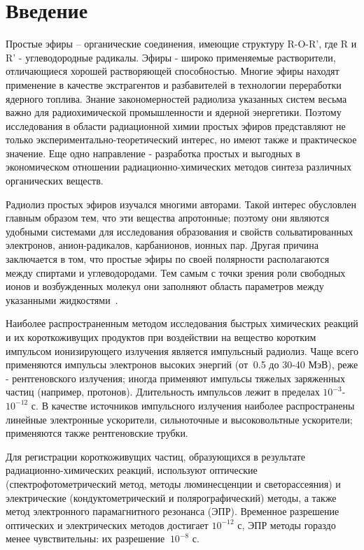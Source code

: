 \documentclass[14pt,titlepage]{extarticle}
\let\oldsection\section
\renewcommand{\section}{\newpage\oldsection}
\newcommand{\sectionwithoutnumber}[1]{
  \section*{#1}
  \addcontentsline{toc}{section}{#1}
}
\begin{document}
\sectionwithoutnumber{Введение}

Простые эфиры – органические соединения, имеющие структуру R-O-R’, где R и R' - углеводородные радикалы.  Эфиры - широко применяемые растворители, отличающиеся хорошей растворяющей способностью. Многие эфиры находят применение в качестве экстрагентов и разбавителей в технологии переработки ядерного топлива. Знание закономерностей радиолиза указанных систем весьма важно для радиохимической промышленности и ядерной энергетики. Поэтому исследования в области радиационной химии простых эфиров представляют не только экспериментально-теоретический интерес, но имеют также и практическое значение. Еще одно направление - разработка простых и выгодных в экономическом отношении радиационно-химических методов синтеза различных органических веществ.

Радиолиз простых эфиров изучался многими авторами. Такой интерес обусловлен главным образом тем, что эти вещества апротонные; поэтому они являются удобными системами для исследования образования и свойств сольватированных электронов, анион-радикалов, карбанионов, ионных пар. Другая причина заключается в том, что простые эфиры по своей полярности располагаются между спиртами и углеводородами. Тем самым с точки зрения роли свободных ионов и возбужденных молекул они заполняют область параметров между указанными жидкостями~\cite{modernrc}.

Наиболее распространенным методом исследования быстрых химических реакций и их короткоживущих продуктов при воздействии на вещество коротким импульсом ионизирующего излучения является импульсный радиолиз. Чаще всего применяются импульсы электронов высоких энергий (от \(~\)0.5 до 30-40 МэВ), реже - рентгеновского излучения; иногда применяют импульсы тяжелых заряженных частиц (например, протонов). Длительность импульсов лежит в пределах \(10^{-3}\)-\(10^{-12}\) с. В качестве источников импульсного излучения наиболее распространены линейные электронные ускорители, сильноточные и высоковольтные ускорители; применяются также рентгеновские трубки.

Для регистрации короткоживущих частиц, образующихся в результате радиационно-химических реакций, используют оптические (спектрофотометрический метод, методы люминесценции и светорассеяния) и электрические (кондуктометрический и полярографический) методы, а также метод электронного парамагнитного резонанса (ЭПР). Временное разрешение оптических и электрических методов достигает \(10^{-12}\) с, ЭПР методы гораздо менее чувствительны: их разрешение \(~10^{-8}\) с.
\end{document}
